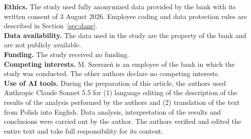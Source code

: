 \documentclass[11pt]{article}
\begin{document}
\noindent\textbf{Ethics.}
The study used fully anonymized data provided by the bank with its written consent of 3 August 2026.
Employee coding and data protection rules are described in Section~\ref{sec:dane}.\\
\textbf{Data availability.}
The data used in the study are the property of the bank and are not publicly available.\\
\textbf{Funding.}
The study received no funding.\\
\textbf{Competing interests.}
M. Szerszeń is an employee of the bank in which the study was conducted. The other authors declare no
competing interests.\\
\textbf{Use of AI tools.}
During the preparation of this article, the authors used Anthropic Claude Sonnet 5.5 for (1) language
editing of the description of the results of the analysis performed by the authors and (2) translation
of the text from Polish into English. Data analysis, interpretation of the results and conclusions were
carried out by the author. The authors verified and edited the entire text and take full responsibility
for its content.


\end{document}
